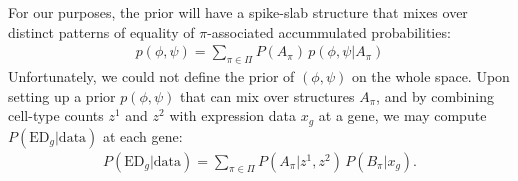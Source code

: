 \documentclass[11pt]{amsart}
\begin{document}
For our purposes, the prior will have a spike-slab structure that mixes
over distinct patterns of equality of $\pi$-associated
accummulated probabilities:
\begin{eqnarray*}
p(\phi,\psi) = \sum_{\pi \in \Pi} P(A_\pi) \, p(\phi,\psi| A_\pi )
\end{eqnarray*}
Unfortunately, we could not define the prior of $(\phi,\psi)$ on the whole space. 
Upon setting up a prior $p(\phi,\psi)$ that can mix over structures
$A_\pi$, and by combining cell-type counts $z^1$ and $z^2$ with
expression data $x_g$ at a gene, we may compute 
$P(\text{ED}_g|\text{data})$ 
at each gene:
\begin{align}
P(\text{ED}_g|\text{data}) = \sum_{\pi \in \Pi} P(A_\pi|z^1, z^2) \, 
P(B_\pi|x_g).
\end{align}
\end{document}
